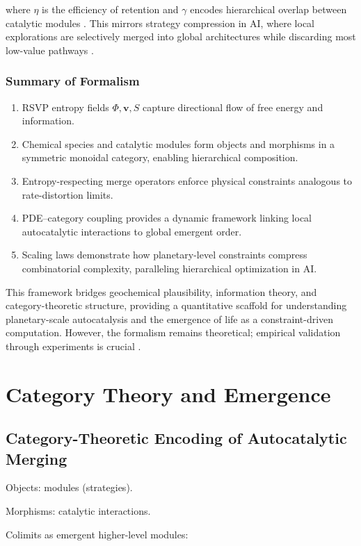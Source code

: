 \documentclass{book}
\begin{document}
where $\eta$ is the efficiency of retention and $\gamma$ encodes hierarchical overlap between catalytic modules \citep{peng2022}. This mirrors strategy compression in AI, where local explorations are selectively merged into global architectures while discarding most low-value pathways \citep{scalinghypothesis, day2024}.

\section{Summary of Formalism}
\begin{enumerate}
\item RSVP entropy fields $\Phi, \mathbf{v}, S$ capture directional flow of free energy and information.
\item Chemical species and catalytic modules form objects and morphisms in a symmetric monoidal category, enabling hierarchical composition.
\item Entropy-respecting merge operators enforce physical constraints analogous to rate-distortion limits.
\item PDE–category coupling provides a dynamic framework linking local autocatalytic interactions to global emergent order.
\item Scaling laws demonstrate how planetary-level constraints compress combinatorial complexity, paralleling hierarchical optimization in AI.
\end{enumerate}

This framework bridges geochemical plausibility, information theory, and category-theoretic structure, providing a quantitative scaffold for understanding planetary-scale autocatalysis and the emergence of life as a constraint-driven computation. However, the formalism remains theoretical; empirical validation through experiments is crucial \citep{sokolskyi2024, plum2025}.

\part{Category Theory and Emergence}

\chapter{Category-Theoretic Encoding of Autocatalytic Merging}
Objects: modules (strategies).

Morphisms: catalytic interactions.

Colimits as emergent higher-level modules:
\end{document}
